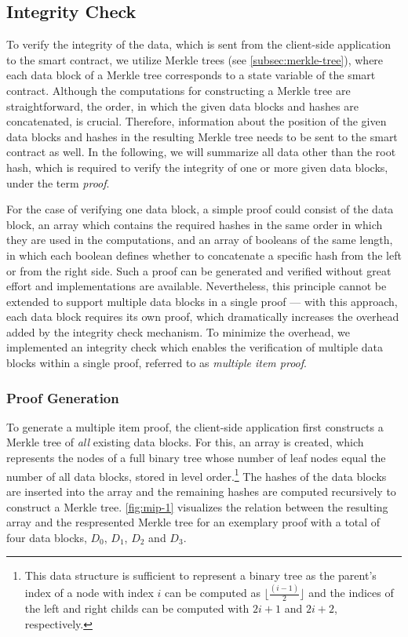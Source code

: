 	\subsection{Integrity Check}
	\label{sec:mip}

		To verify the integrity of the data, which is sent from the client-side application to the smart contract, we utilize Merkle trees (see \autoref{subsec:merkle-tree}), where each data block of a Merkle tree corresponds to a state variable of the smart contract.
		Although the computations for constructing a Merkle tree are straightforward, the order, in which the given data blocks and hashes are concatenated, is crucial.
		Therefore, information about the position of the given data blocks and hashes in the resulting Merkle tree needs to be sent to the smart contract as well.
		In the following, we will summarize all data other than the root hash, which is required to verify the integrity of one or more given data blocks, under the term \emph{proof}.
		
		For the case of verifying one data block, a simple proof could consist of the data block, an array which contains the required hashes in the same order in which they are used in the computations, and an array of booleans of the same length, in which each boolean defines whether to concatenate a specific hash from the left or from the right side.
		Such a proof can be generated and verified without great effort and implementations are available.
		Nevertheless, this principle cannot be extended to support multiple data blocks in a single proof --- with this approach, each data block requires its own proof, which dramatically increases the overhead added by the integrity check mechanism.
		To minimize the overhead, we implemented an integrity check which enables the verification of multiple data blocks within a single proof, referred to as \emph{multiple item proof}.

		\subsubsection*{Proof Generation}
		\label{subsec:mip-generation}

			To generate a multiple item proof, the client-side application first constructs a Merkle tree of \emph{all} existing data blocks.
			For this, an array is created, which represents the nodes of a full binary tree whose number of leaf nodes equal the number of all data blocks, stored in level order.\footnote{This data structure is sufficient to represent a binary tree as the parent's index of a node with index $i$ can be computed as $\lfloor\frac{(i - 1)}2\rfloor$ and the indices of the left and right childs can be computed with $2i + 1$ and $2i + 2$, respectively.} The hashes of the data blocks are inserted into the array and the remaining hashes are computed recursively to construct a Merkle tree.
			\autoref{fig:mip-1} visualizes the relation between the resulting array and the respresented Merkle tree for an exemplary proof with a total of four data blocks, $D_0$, $D_1$, $D_2$ and $D_3$.


